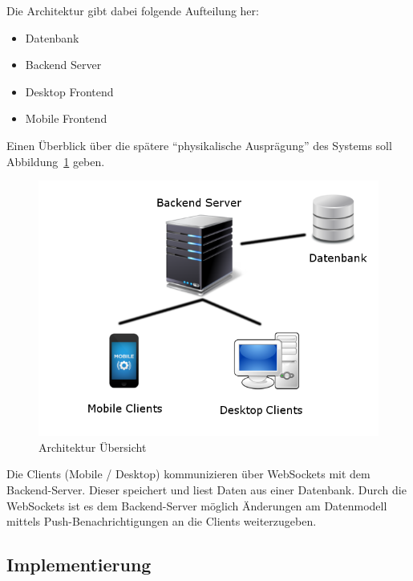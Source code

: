 Die Architektur gibt dabei folgende Aufteilung her:
\begin{itemize}
\item Datenbank
\item Backend Server
\item Desktop Frontend
\item Mobile Frontend
\end{itemize}
Einen Überblick über die spätere ``physikalische Ausprägung'' des
Systems soll Abbildung~\ref{fig:architektur} geben.
\begin{figure}[h]
\includegraphics[scale=0.5]{img/Architektur.png}
\caption{Architektur Übersicht\label{fig:architektur}}
\end{figure}
Die Clients (Mobile / Desktop) kommunizieren über WebSockets mit dem
Backend-Server. Dieser speichert und liest Daten aus einer Datenbank.
Durch die WebSockets ist es dem Backend-Server möglich Änderungen am
Datenmodell mittels Push-Benachrichtigungen an die Clients weiterzugeben.
\subsection{Implementierung}
